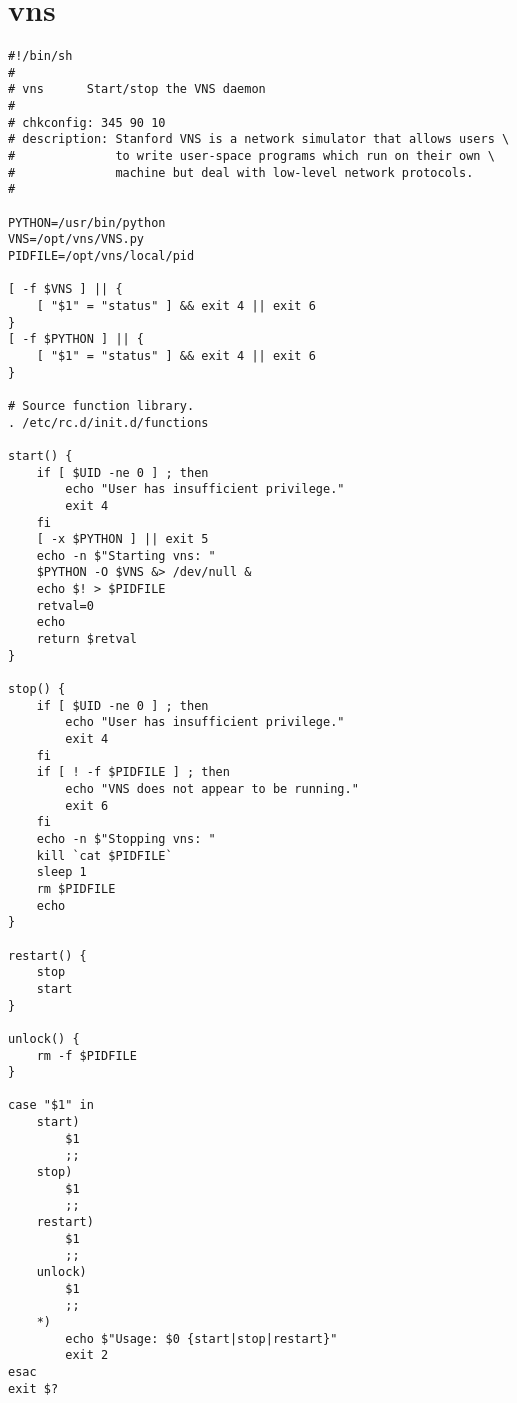 \documentclass[a4paper,12pt]{report}
\begin{document}
\section{vns}
\tiny
\begin{verbatim}
#!/bin/sh                                                                                              
#                                                                                                      
# vns      Start/stop the VNS daemon                                                                   
#                                                                                                      
# chkconfig: 345 90 10                                                                                 
# description: Stanford VNS is a network simulator that allows users \                                 
#              to write user-space programs which run on their own \                                   
#              machine but deal with low-level network protocols.                                      
#                                                                                                      

PYTHON=/usr/bin/python
VNS=/opt/vns/VNS.py
PIDFILE=/opt/vns/local/pid

[ -f $VNS ] || {
    [ "$1" = "status" ] && exit 4 || exit 6
}
[ -f $PYTHON ] || {
    [ "$1" = "status" ] && exit 4 || exit 6
}

# Source function library.                                                                             
. /etc/rc.d/init.d/functions

start() {
    if [ $UID -ne 0 ] ; then
        echo "User has insufficient privilege."
        exit 4
    fi
    [ -x $PYTHON ] || exit 5
    echo -n $"Starting vns: "
    $PYTHON -O $VNS &> /dev/null &
    echo $! > $PIDFILE
    retval=0
    echo
    return $retval
}

stop() {
    if [ $UID -ne 0 ] ; then
        echo "User has insufficient privilege."
        exit 4
    fi
    if [ ! -f $PIDFILE ] ; then
        echo "VNS does not appear to be running."
        exit 6
    fi
    echo -n $"Stopping vns: "
    kill `cat $PIDFILE`
    sleep 1
    rm $PIDFILE
    echo
}

restart() {
    stop
    start
}

unlock() {
    rm -f $PIDFILE
}

case "$1" in
    start)
        $1
        ;;
    stop)
        $1
        ;;
    restart)
        $1
        ;;
    unlock)
        $1
        ;;
    *)
        echo $"Usage: $0 {start|stop|restart}"
        exit 2
esac
exit $?

\end{verbatim}
\normalsize
\end{document}
